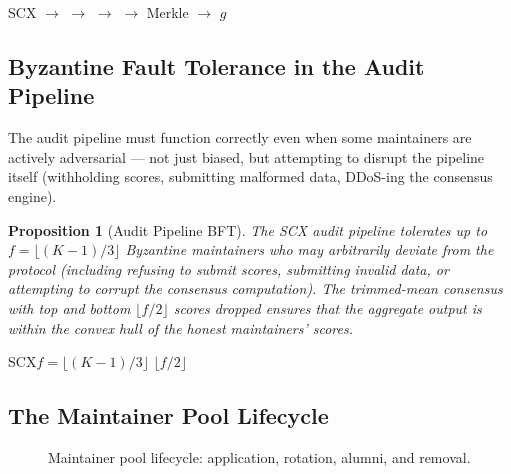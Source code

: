 \documentclass[12pt,a4paper]{article}
\newtheorem{proposition}[theorem]{Proposition}
\theoremstyle{remark}
\begin{document}
\noindent\textbf{}
SCX $\to$  $\to$  $\to$  $\to$ 
Merkle $\to$ $g$

\subsection{Byzantine Fault Tolerance in the Audit Pipeline}

The audit pipeline must function correctly even when some maintainers are
actively adversarial — not just biased, but attempting to disrupt the pipeline
itself (withholding scores, submitting malformed data, DDoS-ing the consensus
engine).

\begin{proposition}[Audit Pipeline BFT]\label{prop:pipeline_bft}
The SCX audit pipeline tolerates up to $f = \lfloor (K-1)/3 \rfloor$ Byzantine
maintainers who may arbitrarily deviate from the protocol (including refusing to
submit scores, submitting invalid data, or attempting to corrupt the consensus
computation). The trimmed-mean consensus with top and bottom $\lfloor f/2 \rfloor$
scores dropped ensures that the aggregate output is within the convex hull of
the honest maintainers' scores.
\end{proposition}

\noindent\textbf{}
SCX$f = \lfloor (K-1)/3 \rfloor$
$\lfloor f/2 \rfloor$

\subsection{The Maintainer Pool Lifecycle}

\begin{figure}[H]
\centering
{}
\caption{Maintainer pool lifecycle: application, rotation, alumni, and removal.}
\label{fig:lifecycle}
\end{figure}
\end{document}

